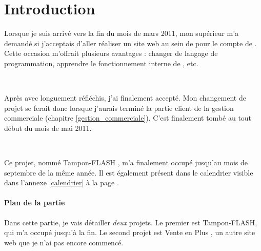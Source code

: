 \chapter{Introduction}
Lorsque je suis arrivé vers la fin du mois de mars 2011, mon supérieur m'a demandé si j'acceptais d'aller réaliser un site web au sein de \fidit{} pour le compte de \solulog. Cette occasion m'offrait plusieurs avantages : changer de langage de programmation, apprendre le fonctionnement interne de \fidit, etc.

~

Après avec longuement réfléchis, j'ai finalement accepté. Mon changement de projet se ferait donc lorsque j'aurais terminé la partie client de la gestion commerciale (chapitre \ref{gestion_commerciale}). C'est finalement tombé au tout début du mois de mai 2011.

~

Ce projet, nommé \og Tampon-FLASH \fg, m'a finalement occupé jusqu'au mois de septembre de la même année. Il est également présent dans le calendrier visible dans l'annexe \ref{calendrier} à la page \pageref{calendrier}.

\subsubsection{Plan de la partie}
Dans cette partie, je vais détailler \emph{deux} projets. Le premier est Tampon-FLASH, qui m'a occupé jusqu'à la fin. Le second projet est \og Vente en Plus \fg, un autre site web que je n'ai pas encore commencé.
